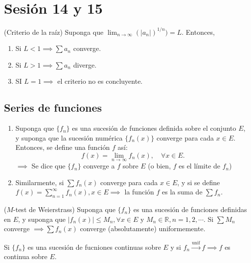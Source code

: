 \section{Sesión 14 y 15}

\begin{teorema}(Criterio de la raíz)
	Suponga que $\lim_{n\to\infty}(|a_n|)^{1/n})=L$. Entonces, 
	\begin{enumerate}
		\item Si $L<1\implies \sum a_n$ converge. 
		\item Si $L>1\implies \sum a_n$ diverge. 
		\item SI $L=1\implies$ el criterio no es concluyente. 
	\end{enumerate}
\end{teorema}

\subsection{Series de funciones}

\begin{nota}
	\begin{enumerate}
		\item Suponga que $\{f_n\}$ es una sucesión de funciones definida sobre el conjunto $E$, y suponga que la sucesión numérica $\{f_n(x)\}$ converge para cada $x\in E$. Entonces, se define una función $f$ así: 
		$$f(x)=\lim_{n\to\infty}f_n(x),\quad \forall x\in E.$$
		$\implies $ Se dice que $\{f_n\}$ converge a $f$ sobre $E$ (o bien, $f$ es el límite de $f_n$)
		\item Similarmente, si $\sum f_n(x)$ converge para cada $x\in E$, y si se define $f(x)=\sum_{n=1}^{\infty} f_n(x), x\in E\implies $ la función $f$ es la suma de $\sum f_n$. 
	\end{enumerate}
\end{nota}

\begin{teorema} ($M$-test de Weierstrass)
	Suponga que $\{f_n\}$ es una sucesión de funciones definidas en $E$, y suponga que $|f_n(x)|\leq M_n,\forall x\in E$ y $M_n\in \mathbb{R}, n=1,2,\cdots$. Si $\sum M_n$ converge $\implies \sum f_n(x)$ converge (absolutamente) uniformemente.  
\end{teorema}

\begin{teorema}
	Si $\{f_n\}$ es una sucesión de fucniones continuas sobre $E$ y si $f_n\xrightarrow{\text{unif}} f\implies f$ es continua sobre $E$. 
\end{teorema}

